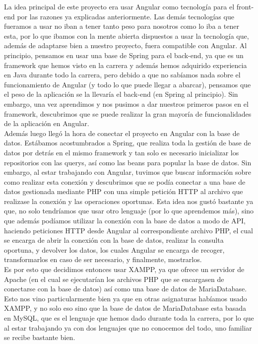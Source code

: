 La idea principal de este proyecto era usar Angular como tecnología para el front-end por las razones ya explicadas anteriormente. Las demás tecnologías que fueramos a usar no iban a tener tanto peso para nosotros como lo iba a tener esta, por lo que ibamos con la mente abierta dispuestos a usar la tecnología que, además de adaptarse bien a nuestro proyecto, fuera compatible con Angular. Al principio, pensamos en usar una base de Spring para el back-end, ya que es un framework que hemos visto en la carrera y además hemos adquirido experiencia en Java durante todo la carrera, pero debido a que no sabíamos nada sobre el funcionamiento de Angular (y todo lo que puede llegar a abarcar), pensamos que el peso de la aplicación se la llevaría el back-end (en Spring al principio). Sin embargo, una vez aprendimos y nos pusimos a dar nuestros primeros pasos en el framework, descubrimos que se puede realizar la gran mayoría de funcionalidades de la aplicación en Angular.\\

Además luego llegó la hora de conectar el proyecto en Angular con la base de datos. Estábamos acostumbrados a Spring, que realiza toda la gestión de base de datos por detrás en el mismo framework y tan solo es necesario inicializar los repositorios con las querys, así como las beans para popular la base de datos. Sin embargo, al estar trabajando con Angular, tuvimos que buscar información sobre como realizar esta conexión y descubrimos que se podía conectar a una base de datos gestionada mediante PHP con una simple petición HTTP al archivo que realizase la conexión y las operaciones oportunas. Esta idea nos gustó bastante ya que, no solo tendríamos que usar otro lenguaje (por lo que aprendemos más), sino que además podíamos utilizar la conexión con la base de datos a modo de API, haciendo peticiones HTTP desde Angular al correspondiente archivo PHP, el cual se encarga de abrir la conexión con la base de datos, realizar la consulta oportuna, y devolver los datos, los cuales Angular se encarga de recoger, transformarlos en caso de ser necesario, y finalmente, mostrarlos.\\

Es por esto que decidimos entonces usar XAMPP, ya que ofrece un servidor de Apache (en el cual se ejecutarían los archivos PHP que se encargasen de conectarse con la base de datos) así como una base de datos de MariaDatabase. Esto nos vino particularmente bien ya que en otras asignaturas habíamos usado XAMPP, y no solo eso sino que la base de datos de MariaDatabase esta basada en MySQL, que es el lenguaje que hemos dado durante toda la carrera, por lo que al estar trabajando ya con dos lenguajes que no conocemos del todo, uno familiar se recibe bastante bien.\\

